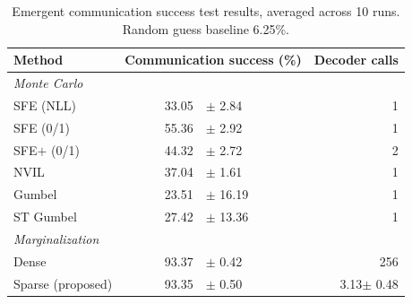 \begin{table}[t]
    \begin{center}
        \tlfstyle
        \begin{tabular}{lr@{~}lr}
            \toprule
            Method                                 & \multicolumn{2}{c}{Communication success (\%)} & Decoder calls                   \\
            \midrule
            {\emph{Monte Carlo}}                   &                                                &                           &     \\
            SFE (NLL)                              & 33.05                                          & {\color{gray}$\pm$ 2.84}  & 1   \\
            SFE (0/1)                              & 55.36                                          & {\color{gray}$\pm$ 2.92}  & 1   \\
            SFE$+$ (0/1)                           & 44.32                                          & {\color{gray}$\pm$ 2.72}  & 2   \\
            NVIL                                   & 37.04                                          & {\color{gray}$\pm$ 1.61}  & 1   \\
            Gumbel                                 & 23.51                                          & {\color{gray}$\pm$ 16.19} & 1   \\
            ST Gumbel                              & 27.42                                          & {\color{gray}$\pm$ 13.36} & 1   \\
            \spacerule
            \emph{Marginalization}                 &                                                &                           &     \\
            Dense                                  & 93.37                                          & {\color{gray}$\pm$ 0.42}  & 256 \\
            Sparse {\small \color{gray}(proposed)} &
            93.35                                  & {\color{gray}$\pm$ 0.50}                       &
            3.13{\color{gray}$\pm$ 0.48}                                                                                              \\
            \bottomrule
        \end{tabular}
    \end{center}
    \caption{Emergent communication success test results,
        averaged across 10 runs. Random guess baseline 6.25\%.}
    \label{tab:symbol}
\end{table}

